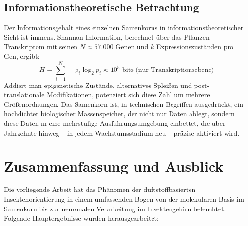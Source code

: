 \documentclass[12pt,a4paper]{article}
\begin{document}
\subsection{Informationstheoretische Betrachtung}

Der Informationsgehalt eines einzelnen Samenkorns in informationstheoretischer Sicht ist immens. Shannon-Information, berechnet \"uber das Pflanzen-Transkriptom mit seinen $N \approx 57.000$ Genen und $k$ Expressionszust\"anden pro Gen, ergibt:
\[
  H = \sum_{i=1}^{N} - p_i \log_2 p_i \approx 10^5 \text{ bits (nur Transkriptionsebene)}
\]
Addiert man epigenetische Zust\"ande, alternatives Splei{\ss}en und post-translationale Modifikationen, potenziert sich diese Zahl um mehrere Gr\"o{\ss}enordnungen. Das Samenkorn ist, in technischen Begriffen ausgedr\"uckt, ein hochdichter biologischer Massenspeicher, der nicht nur Daten ablegt, sondern diese Daten in eine mehrstufige Ausf\"uhrungsumgebung einbettet, die \"uber Jahrzehnte hinweg -- in jedem Wachstumsstadium neu -- pr\"azise aktiviert wird.

\section{Zusammenfassung und Ausblick}

Die vorliegende Arbeit hat das Ph\"anomen der duftstoffbasierten Insektenorientierung in einem umfassenden Bogen von der molekularen Basis im Samenkorn bis zur neuronalen Verarbeitung im Insektengehirn beleuchtet. Folgende Hauptergebnisse wurden herausgearbeitet:
\end{document}
